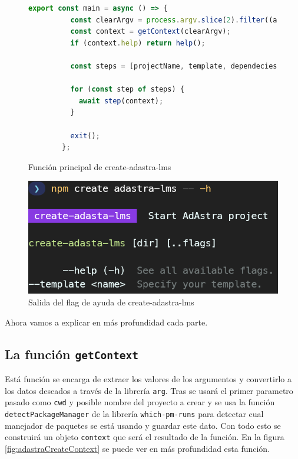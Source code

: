 \begin{figure}
    \begin{lstlisting}[language=Javascript]
        export const main = async () => {
          const clearArgv = process.argv.slice(2).filter((arg) => arg !== "--");
          const context = getContext(clearArgv);
          if (context.help) return help();
        
          const steps = [projectName, template, dependecies, git, next];
        
          for (const step of steps) {
            await step(context);
          }
        
          exit();
        };
    \end{lstlisting}
    \caption{Función principal de create-adastra-lms}
    \label{fig:adastraCreateMain}
\end{figure}

\begin{figure}
    \centering
    \includegraphics{images/adastraHelp.png}
    \caption{Salida del flag de ayuda de create-adastra-lms}
    \label{fig:adastraCreateHelp}
\end{figure}

Ahora vamos a explicar en más profundidad cada parte.

\subsection{La función {\tt getContext}}
Está función se encarga de extraer los valores de los argumentos y convertirlo a los datos deseados a través de la librería \verb|arg|\cite{arg}. Tras se usará el primer parametro pasado como \verb|cwd| y posible nombre del proyecto a crear y se usa la función \verb|detectPackageManager| de la librería \verb|which-pm-runs|\cite{which-pm-runs} para detectar cual manejador de paquetes se está usando y guardar este dato. Con todo esto se construirá un objeto \verb|context| que será el resultado de la función. En la figura \ref{fig:adastraCreateContext} se puede ver en más profundidad esta función.

